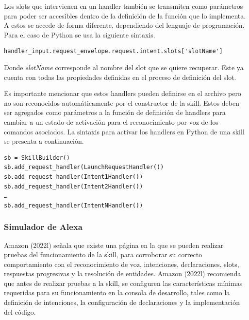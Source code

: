 Los slots que intervienen en un handler también se transmiten como parámetros para poder ser accesibles dentro de la definición de la función que lo implementa. A estos se accede de forma diferente, dependiendo del lenguaje de programación. Para el caso de Python se usa la siguiente sintaxis.

\begin{tcolorbox}[colback=white!25!white,colframe=blue]
  \begin{verbatim}
handler_input.request_envelope.request.intent.slots['slotName']
  \end{verbatim}
\end{tcolorbox}

Donde \textit{slotName} corresponde al nombre del slot que se quiere recuperar. Este ya cuenta con todas las propiedades definidas en el proceso de definición del slot.

Es importante mencionar que estos handlers pueden definirse en el archivo pero no son reconocidos automáticamente por el constructor de la skill. Estos deben ser agregados como parámetros a la función de definición de handlers para cambiar a un estado de activación para el reconocimiento por voz de los comandos asociados. La sintaxis para activar los handlers en Python de una skill se presenta a continuación.

\begin{tcolorbox}[colback=white!25!white,colframe=blue]
  \begin{verbatim}
sb = SkillBuilder()
sb.add_request_handler(LaunchRequestHandler())
sb.add_request_handler(Intent1Handler())
sb.add_request_handler(Intent2Handler())
…
sb.add_request_handler(IntentNHandler())
  \end{verbatim}
\end{tcolorbox}


\subsubsection{Simulador de Alexa}
\label{SimuladorcapIV}

Amazon (2022l) señala que existe una página en la que se pueden realizar pruebas del funcionamiento de la skill, para corroborar su correcto comportamiento con el reconocimiento de voz, intenciones, declaraciones, slots, respuestas progresivas y la resolución de entidades. Amazon (2022l) recomienda que antes de realizar pruebas a la skill, se configuren las características mínimas requeridas para su funcionamiento en la consola de desarrollo, tales como la definición de intenciones, la configuración de declaraciones y la implementación del código.

